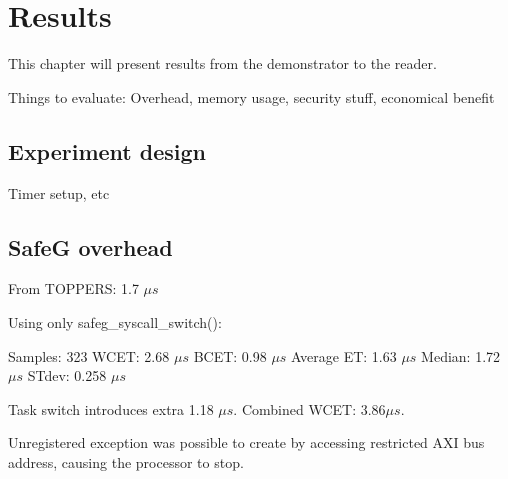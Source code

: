 \chapter{Results}
\label{sec:results}

This chapter will present results from the demonstrator to the reader.

Things to evaluate: Overhead, memory usage, security stuff, economical benefit

\section{Experiment design}
Timer setup, etc

\section{SafeG overhead}

From TOPPERS: 1.7 $\mu s$

Using only safeg\_syscall\_switch():

Samples: 323
WCET: 2.68 $\mu s$
BCET: 0.98 $\mu s$
Average ET: 1.63 $\mu s$
Median: 1.72 $\mu s$
STdev: 0.258 $\mu s$

Task switch introduces extra 1.18 $\mu s$. Combined WCET: $3.86 \mu s$.

Unregistered exception was possible to create by accessing restricted AXI bus address, causing the processor to stop.
